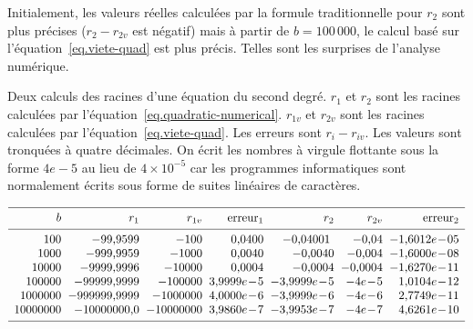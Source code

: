 Initialement, les valeurs réelles calculées par la formule traditionnelle pour $r_2$ sont plus précises ($r_2-r_{2v}$ est négatif) mais à partir de $b=100\,000$, le calcul basé sur l'équation~\ref{eq.viete-quad} est plus précis. Telles sont les surprises de l'analyse numérique.

\begin{table}[htbp]
\footnotesize
\caption{Deux calculs des racines d'une équation du second degré. $r_1$ et $r_2$ sont les racines calculées par l'équation~\ref{eq.quadratic-numerical}. $r_{1v}$ et $r_{2v}$ sont les racines calculées par l'équation~\ref{eq.viete-quad}. Les erreurs sont $r_{i}-r_{iv}$. Les valeurs sont tronquées à quatre décimales.
On écrit les nombres à virgule flottante sous la forme $4e-5$ au lieu de $4\times 10^{-5}$ car les programmes informatiques sont normalement écrits sous forme de suites linéaires de caractères.} \label{t.quadratic}
\[
\begin{array}{r@{\hspace{2mm}}r@{\hspace{2mm}}r@{\hspace{2mm}}r@{\hspace{2mm}}r@{\hspace{2mm}}r@{\hspace{2mm}}r}
\hline
\noalign{\smallskip}
b & r_1 & r_{1v} & \mathrm{erreur}_1 & r_2 & r_{2v} & \mathrm{erreur}_2\\
\noalign{\smallskip}\hline\noalign{\smallskip}
100  &  -\mbox{99,9599}  &  -100  &  \mbox{0,0400}  &  -\mbox{0,04001}\  &  -\mbox{0,04}  &  -\mbox{1,6012}e\!-\!05\\
1000  &  -\mbox{999,9959}  &  -1000  &  \mbox{0,0040}  &  -\mbox{0,0040}  &  -\mbox{0,004}  &  -\mbox{1,6000}e\!-\!08\\
10000  &  -\mbox{9999,9996}  &  -10000  &  \mbox{0,0004}  &  -\mbox{0,0004}  &  -\mbox{0,0004}  &  -\mbox{1,6270}e\!-\!11\\
100000  &  -\mbox{99999,9999}  &  -100000  &  \mbox{3,9999}e\!-\!5  &  -\mbox{3,9999}e\!-\!5  &  -4e\!-\!5  &  \mbox{1,0104}e\!-\!12\\
1000000  &  -\mbox{999999,9999}  &  -1000000  &  \mbox{4,0000}e\!-\!6  &  -\mbox{3,9999}e\!-\!6  &  -4e\!-\!6  &  \mbox{2,7749}e\!-\!11\\
10000000  &  -\mbox{10000000,0}  &  -10000000  &  \mbox{3,9860}e\!-\!7  &  -\mbox{3,9953}e\!-\!7  &  -4e\!-\!7  &  \mbox{4,6261}e\!-\!10\\
 \noalign{\smallskip}
 \hline
\end{array}
\]
\end{table}


